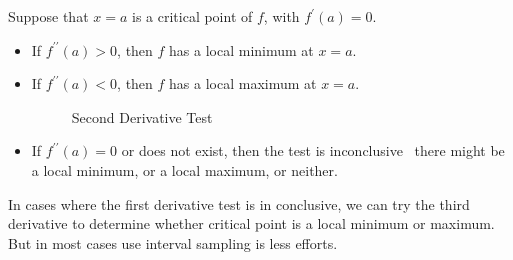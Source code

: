 \begin{enumerate}
    \indent Suppose that \(x=a\) is a critical point of \(f\), with \(f^\prime (a)=0\).
    \begin{itemize}
      \item If \(f^{\prime\prime}(a)>0\), then \(f\) has a local minimum at \(x=a\).
      \item If \(f^{\prime\prime}(a)<0\), then \(f\) has a local maximum at \(x=a\).
        \begin{figure}[H]
          \centering
          \caption{Second Derivative Test}
        \end{figure}
      \item If \(f^{\prime\prime}(a)=0\) or does not exist, then the test is inconclusive \textemdash\ there might be a local minimum, or a local maximum, or neither.
    \end{itemize}
    \begin{note}
      In cases where the first derivative test is in conclusive, we can try the third derivative to determine whether critical point is a local minimum or maximum. But in most cases use interval sampling is less efforts.
    \end{note}
\end{enumerate}
